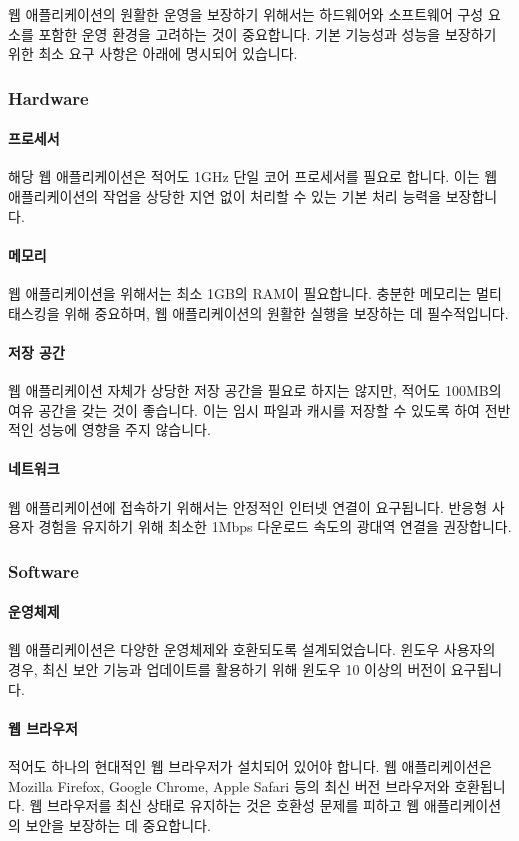 \documentclass[a4paper, 12pt]{article}
\begin{document}
웹 애플리케이션의 원활한 운영을 보장하기 위해서는 하드웨어와 소프트웨어 구성 요소를 포함한 운영 환경을 고려하는 것이 중요합니다. 기본 기능성과 성능을 보장하기 위한 최소 요구 사항은 아래에 명시되어 있습니다.

\subsubsection{Hardware}
\paragraph{프로세서}
해당 웹 애플리케이션은 적어도 1GHz 단일 코어 프로세서를 필요로 합니다. 이는 웹 애플리케이션의 작업을 상당한 지연 없이 처리할 수 있는 기본 처리 능력을 보장합니다.

\paragraph{메모리}
웹 애플리케이션을 위해서는 최소 1GB의 RAM이 필요합니다. 충분한 메모리는 멀티태스킹을 위해 중요하며, 웹 애플리케이션의 원활한 실행을 보장하는 데 필수적입니다.

\paragraph{저장 공간}
웹 애플리케이션 자체가 상당한 저장 공간을 필요로 하지는 않지만, 적어도 100MB의 여유 공간을 갖는 것이 좋습니다. 이는 임시 파일과 캐시를 저장할 수 있도록 하여 전반적인 성능에 영향을 주지 않습니다.

\paragraph{네트워크}
웹 애플리케이션에 접속하기 위해서는 안정적인 인터넷 연결이 요구됩니다. 반응형 사용자 경험을 유지하기 위해 최소한 1Mbps 다운로드 속도의 광대역 연결을 권장합니다.

\subsubsection{Software}
\paragraph{운영체제}
웹 애플리케이션은 다양한 운영체제와 호환되도록 설계되었습니다. 윈도우 사용자의 경우, 최신 보안 기능과 업데이트를 활용하기 위해 윈도우 10 이상의 버전이 요구됩니다.

\paragraph{웹 브라우저}
적어도 하나의 현대적인 웹 브라우저가 설치되어 있어야 합니다. 웹 애플리케이션은 Mozilla Firefox, Google Chrome, Apple Safari 등의 최신 버전 브라우저와 호환됩니다. 웹 브라우저를 최신 상태로 유지하는 것은 호환성 문제를 피하고 웹 애플리케이션의 보안을 보장하는 데 중요합니다.
\end{document}
